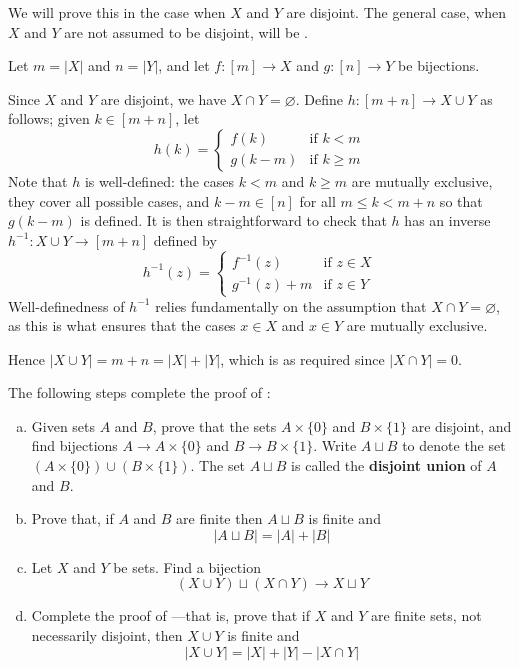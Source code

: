 \begin{cproof}
We will prove this in the case when $X$ and $Y$ are disjoint. The general case, when $X$ and $Y$ are not assumed to be disjoint, will be .

Let $m = |X|$ and $n=|Y|$, and let $f : [m] \to X$ and $g : [n] \to Y$ be bijections.

Since $X$ and $Y$ are disjoint, we have $X \cap Y = \varnothing$. Define $h : [m+n] \to X \cup Y$ as follows; given $k \in [m+n]$, let
\[ h(k) = \begin{cases} f(k) & \text{if } k < m \\ g(k-m) & \text{if } k \ge m \end{cases} \]
Note that $h$ is well-defined: the cases $k < m$ and $k \ge m$ are mutually exclusive, they cover all possible cases, and $k-m \in [n]$ for all $m \le k < m+n$ so that $g(k-m)$ is defined. It is then straightforward to check that $h$ has an inverse $h^{-1} : X \cup Y \to [m+n]$ defined by
\[ h^{-1}(z) = \begin{cases} f^{-1}(z) & \text{if } z \in X \\ g^{-1}(z)+m & \text{if } z \in Y \end{cases} \]
Well-definedness of $h^{-1}$ relies fundamentally on the assumption that $X \cap Y = \varnothing$, as this is what ensures that the cases $x \in X$ and $x \in Y$ are mutually exclusive.

Hence $|X \cup Y| = m+n = |X| + |Y|$, which is as required since $|X \cap Y| = 0$.
\end{cproof}

\begin{exercise}
\label{exSizeOfUnion}
The following steps complete the proof of :
\begin{enumerate}[(a)]
\item Given sets $A$ and $B$, prove that the sets $A \times \{ 0 \}$ and $B \times \{ 1 \}$ are disjoint, and find bijections $A \to A \times \{ 0 \}$ and $B \to B \times \{ 1 \}$. Write $A \sqcup B$  to denote the set $(A \times \{ 0 \}) \cup (B \times \{ 1 \})$. The set $A \sqcup B$ is called the \textbf{disjoint union} of $A$ and $B$.
\item Prove that, if $A$ and $B$ are finite then $A \sqcup B$ is finite and
\[ |A \sqcup B| = |A| + |B| \]
\item Let $X$ and $Y$ be sets. Find a bijection
\[ (X \cup Y) \sqcup (X \cap Y) \to X \sqcup Y \]
\item Complete the proof of ---that is, prove that if $X$ and $Y$ are finite sets, not necessarily disjoint, then $X \cup Y$ is finite and
\[ |X \cup Y| = |X| + |Y| - |X \cap Y| \]
\end{enumerate}
\end{exercise}

